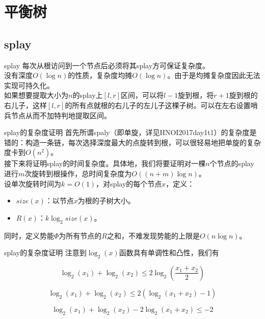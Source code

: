 \documentclass{beamer}
\begin{document}
\section{平衡树}
\subsection{splay}
\begin{frame}{splay}
每次从根访问到一个节点后必须将其splay方可保证复杂度。\\

没有深度$O(\log n)$的性质，复杂度均摊$O(\log n)$。由于是均摊复杂度因此无法实现可持久化。\\

如果想要提取大小为$n$的splay上$[l,r]$区间，可以将$l-1$旋到根，将$r+1$旋到根的右儿子，这样$[l,r]$的所有点就根的右儿子的左儿子这棵子树。可以在左右设置哨兵节点从而不加特判地提取区间。
\end{frame}
\begin{frame}{splay的复杂度证明}
首先所谓spaly（即单旋，详见HNOI2017day1t1）的复杂度是错的：构造一条链，每次选择深度最大的点旋转到根，可以很轻易地把单旋的复杂度卡到$O(n^2)$。\\

接下来将证明splay的时间复杂度。具体地，我们将要证明对一棵$n$个节点的splay进行$m$次旋转到根操作，总时间复杂度为$O((n+m)\log n)$。\\

设单次旋转时间为$k=O(1)$，对splay的每个节点$x$，定义：

\begin{itemize}
\item $size(x)$：以节点$x$为根的子树大小。
\item $R(x)$：$k\log_2size(x)$。
\end{itemize}

同时，定义势能$\Phi$为所有节点的$R$之和，不难发现势能的上限是$O(n\log n)$。

\end{frame}
\begin{frame}{splay的复杂度证明}
注意到$\log_2(x)$函数具有单调性和凸性，我们有

$$\log_2(x_1)+\log_2(x_2)\le 2\log_2(\frac{x_1+x_2}{2})$$

$$\log_2(x_1)+\log_2(x_2)\le 2(\log_2(x_1+x_2)-1)$$

$$\log_2(x_1)+\log_2(x_2)-2\log_2(x_1+x_2)\le -2$$

\end{frame}
\end{document}
